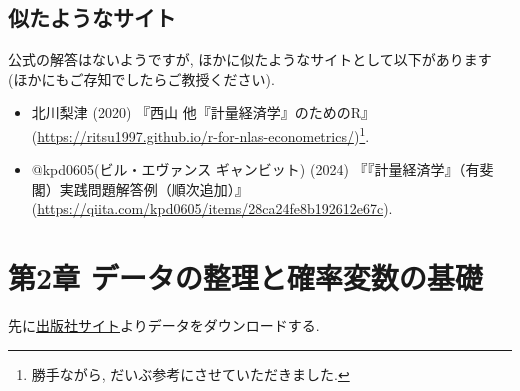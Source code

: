 \documentclass[
]{book}
\providecommand{\tightlist}{%
  \setlength{\itemsep}{0pt}\setlength{\parskip}{0pt}}
\begin{document}
\hypertarget{ux4f3cux305fux3088ux3046ux306aux30b5ux30a4ux30c8}{%
\section*{似たようなサイト}\label{ux4f3cux305fux3088ux3046ux306aux30b5ux30a4ux30c8}}

公式の解答はないようですが, ほかに似たようなサイトとして以下があります (ほかにもご存知でしたらご教授ください).

\begin{itemize}
\tightlist
\item
  北川梨津 (2020) 『西山 他『計量経済学』のためのR』(\url{https://ritsu1997.github.io/r-for-nlas-econometrics/})\footnote{勝手ながら, だいぶ参考にさせていただきました.}.
\item
  @kpd0605(ビル・エヴァンス ギャンビット) (2024) 『『計量経済学』（有斐閣）実践問題解答例（順次追加）』(\url{https://qiita.com/kpd0605/items/28ca24fe8b192612e67c}).
\end{itemize}

\hypertarget{ch2}{%
\chapter*{第2章 データの整理と確率変数の基礎}\label{ch2}}

先に\href{https://www.yuhikaku.co.jp/books/detail/9784641053854}{出版社サイト}よりデータをダウンロードする.
\end{document}
